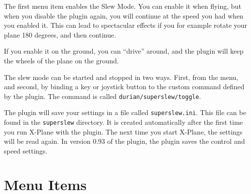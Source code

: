 \documentclass[a4paper,12pt]{article}
\begin{document}
The first menu item enables the Slew Mode. You can enable it when
flying, but when you disable the plugin again, you will continue at
the speed you had when you enabled it. This can lead to spectacular
effects if you for example rotate your plane 180 degrees, and then
continue. 

If you enable it on the ground, you can ``drive'' around, and the
plugin will keep the wheels of the plane on the ground.

The slew mode can be started and stopped in two ways. First, from the
menu, and second, by binding a key or joystick button to the custom command
defined by the plugin. The command is called
\texttt{durian/superslew/toggle}. 

The plugin will save your settings in a file called \texttt{superslew.ini}. This
file can be found in the \texttt{superslew} directory. It is created
automatically after the first time you run X-Plane with the plugin. The next
time you start X-Plane, the settings will be read again. In version 0.93 of the
plugin, the plugin saves the control and speed settings.

\vspace{\baselineskip}
\section*{Menu Items}
\end{document}
